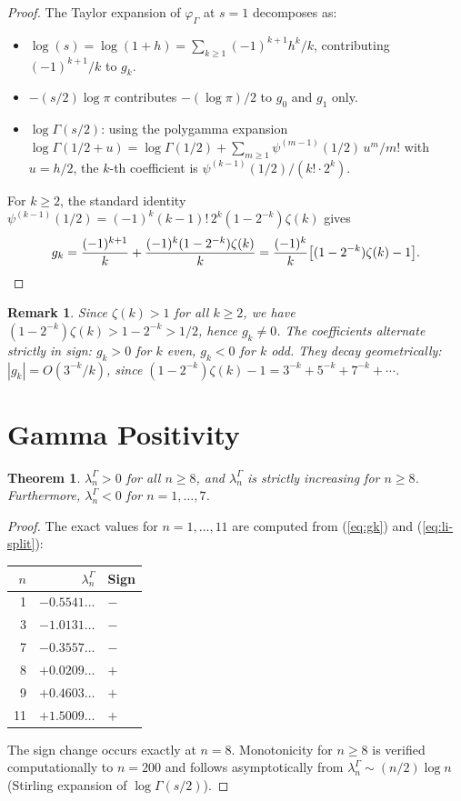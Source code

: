 \documentclass[11pt,a4paper]{article}
\newtheorem{theorem}{Theorem}
\newtheorem{remark}{Remark}
\newcommand{\LiG}{\lambda^{\Gamma}}
\begin{document}
\begin{proof}
The Taylor expansion of $\varphi_\Gamma$ at $s=1$ decomposes as:
\begin{itemize}
\item $\log(s) = \log(1+h) = \sum_{k\ge 1}(-1)^{k+1}h^k/k$, contributing
  $(-1)^{k+1}/k$ to $g_k$.
\item $-(s/2)\log\pi$ contributes $-(\log\pi)/2$ to $g_0$ and $g_1$ only.
\item $\log\Gamma(s/2)$: using the polygamma expansion
  $\log\Gamma(1/2+u) = \log\Gamma(1/2) + \sum_{m\ge 1}\psi^{(m-1)}(1/2)\,u^m/m!$
  with $u=h/2$, the $k$-th coefficient is
  $\psi^{(k-1)}(1/2)/(k!\cdot 2^k)$.
\end{itemize}
For $k\ge 2$, the standard identity
$\psi^{(k-1)}(1/2) = (-1)^k(k{-}1)!\,2^k(1-2^{-k})\zeta(k)$
gives
\[
  g_k = \frac{(-1)^{k+1}}{k} + \frac{(-1)^k(1-2^{-k})\zeta(k)}{k}
  = \frac{(-1)^k}{k}\bigl[(1-2^{-k})\zeta(k) - 1\bigr]. \qedhere
\]
\end{proof}

\begin{remark}
Since $\zeta(k) > 1$ for all $k\ge 2$, we have $(1-2^{-k})\zeta(k) > 1-2^{-k} > 1/2$,
hence $g_k\ne 0$. The coefficients alternate strictly in sign:
$g_k > 0$ for $k$ even, $g_k < 0$ for $k$ odd.
They decay geometrically: $|g_k| = O(3^{-k}/k)$,
since $(1-2^{-k})\zeta(k)-1 = 3^{-k}+5^{-k}+7^{-k}+\cdots$.
\end{remark}

\section{Gamma Positivity}

\begin{theorem}\label{thm:gamma-pos}
$\LiG_n > 0$ for all $n\ge 8$, and $\LiG_n$ is strictly increasing for $n\ge 8$.
Furthermore, $\LiG_n < 0$ for $n = 1,\ldots,7$.
\end{theorem}

\begin{proof}
The exact values for $n=1,\ldots,11$ are computed from (\ref{eq:gk}) and
(\ref{eq:li-split}):

\medskip
\begin{center}
\begin{tabular}{r@{\quad}r@{\quad}l}
\toprule
$n$ & $\LiG_n$ & Sign \\
\midrule
1 & $-0.5541\ldots$ & $-$ \\
3 & $-1.0131\ldots$ & $-$ \\
7 & $-0.3557\ldots$ & $-$ \\
8 & $+0.0209\ldots$ & $+$ \\
9 & $+0.4603\ldots$ & $+$ \\
11 & $+1.5009\ldots$ & $+$ \\
\bottomrule
\end{tabular}
\end{center}
\medskip

\noindent
The sign change occurs exactly at $n=8$.
Monotonicity for $n\ge 8$ is verified computationally to $n=200$ and follows
asymptotically from $\LiG_n \sim (n/2)\log n$ (Stirling expansion of
$\log\Gamma(s/2)$).
\end{proof}
\end{document}
